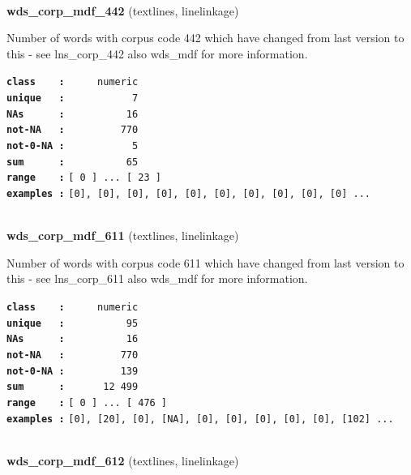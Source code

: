 \documentclass[]{article}
\begin{document}
~

\textbf{wds\_corp\_mdf\_442} (textlines, linelinkage)

Number of words with corpus code 442 which have changed from last
version to this - see lns\_corp\_442 also wds\_mdf for more information.

\textbf{\texttt{class\ \ \ \ :}} \texttt{~~~~~numeric}\\
\textbf{\texttt{unique\ \ \ :}} \texttt{~~~~~~~~~~~7}\\
\textbf{\texttt{NAs\ \ \ \ \ \ :}} \texttt{~~~~~~~~~~16}\\
\textbf{\texttt{not-NA\ \ \ :}} \texttt{~~~~~~~~~770}\\
\textbf{\texttt{not-0-NA\ :}} \texttt{~~~~~~~~~~~5}\\
\textbf{\texttt{sum\ \ \ \ \ \ :}} \texttt{~~~~~~~~~~65}\\
\textbf{\texttt{range\ \ \ \ :}}
\texttt{{[}\ 0\ {]}\ ...\ {[}\ 23\ {]}}\\
\textbf{\texttt{examples\ :}}
\texttt{{[}0{]},\ {[}0{]},\ {[}0{]},\ {[}0{]},\ {[}0{]},\ {[}0{]},\ {[}0{]},\ {[}0{]},\ {[}0{]},\ {[}0{]}\ ...}\\

~

\textbf{wds\_corp\_mdf\_611} (textlines, linelinkage)

Number of words with corpus code 611 which have changed from last
version to this - see lns\_corp\_611 also wds\_mdf for more information.

\textbf{\texttt{class\ \ \ \ :}} \texttt{~~~~~numeric}\\
\textbf{\texttt{unique\ \ \ :}} \texttt{~~~~~~~~~~95}\\
\textbf{\texttt{NAs\ \ \ \ \ \ :}} \texttt{~~~~~~~~~~16}\\
\textbf{\texttt{not-NA\ \ \ :}} \texttt{~~~~~~~~~770}\\
\textbf{\texttt{not-0-NA\ :}} \texttt{~~~~~~~~~139}\\
\textbf{\texttt{sum\ \ \ \ \ \ :}} \texttt{~~~~~~12~499}\\
\textbf{\texttt{range\ \ \ \ :}}
\texttt{{[}\ 0\ {]}\ ...\ {[}\ 476\ {]}}\\
\textbf{\texttt{examples\ :}}
\texttt{{[}0{]},\ {[}20{]},\ {[}0{]},\ {[}NA{]},\ {[}0{]},\ {[}0{]},\ {[}0{]},\ {[}0{]},\ {[}0{]},\ {[}102{]}\ ...}\\

~

\textbf{wds\_corp\_mdf\_612} (textlines, linelinkage)
\end{document}
